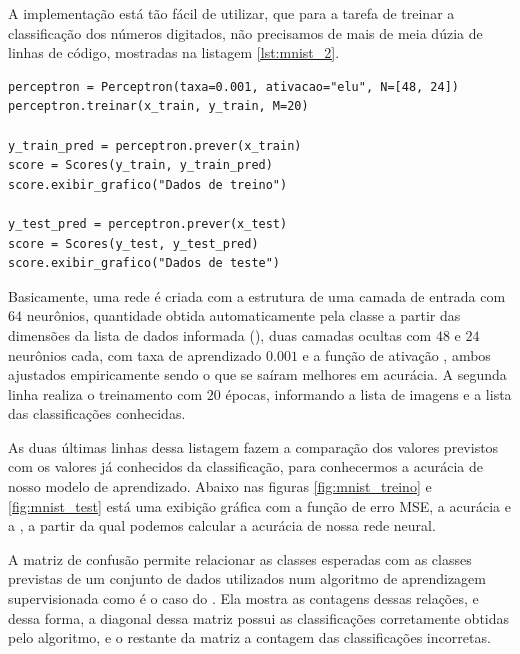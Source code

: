 A implementação está tão fácil de utilizar, que para a tarefa de treinar a classificação dos números digitados, não precisamos de mais de meia dúzia de linhas de código, mostradas na listagem \ref{lst:mnist_2}.

\begin{scriptsize}
\estiloR
\begin{lstlisting}[caption={Trecho do script \eng{mnist\_test.py}}, label={lst:mnist_2}, escapeinside={\%}]
perceptron = Perceptron(taxa=0.001, ativacao="elu", N=[48, 24])
perceptron.treinar(x_train, y_train, M=20)

y_train_pred = perceptron.prever(x_train)
score = Scores(y_train, y_train_pred)
score.exibir_grafico("Dados de treino")

y_test_pred = perceptron.prever(x_test)
score = Scores(y_test, y_test_pred)
score.exibir_grafico("Dados de teste")
\end{lstlisting}
\end{scriptsize}

Basicamente, uma rede é criada com a estrutura de uma camada de entrada com $64$ neurônios, quantidade obtida automaticamente pela classe a partir das dimensões da lista de dados informada (), duas camadas ocultas com $48$ e $24$ neurônios cada, com taxa de aprendizado $0.001$ e a função de ativação , ambos ajustados empiricamente sendo o que se saíram melhores em acurácia. A segunda linha realiza o treinamento com $20$ épocas, informando a lista de imagens e a lista das classificações conhecidas.

As duas últimas linhas dessa listagem fazem a comparação dos valores previstos com os valores já conhecidos da classificação, para conhecermos a acurácia de nosso modelo de aprendizado. Abaixo nas figuras \ref{fig:mnist_treino} e \ref{fig:mnist_test} está uma exibição gráfica com a função de erro MSE, a acurácia e a , a partir da qual podemos calcular a acurácia de nossa rede neural.

A matriz de confusão permite relacionar as classes esperadas com as classes previstas de um conjunto de dados utilizados num algoritmo de aprendizagem supervisionada como é o caso do . Ela mostra as contagens dessas relações, e dessa forma, a diagonal dessa matriz possui as classificações corretamente obtidas pelo algoritmo, e o restante da matriz a contagem das classificações incorretas.

